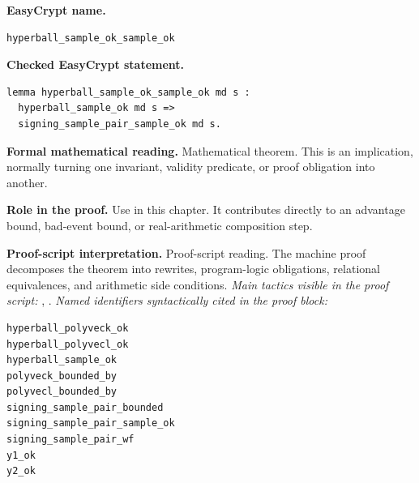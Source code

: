 \begin{formaltheorem}
\noindent\textbf{EasyCrypt name.}
\begin{lstlisting}[language=EasyCrypt,basicstyle=\ttfamily\scriptsize]
hyperball_sample_ok_sample_ok
\end{lstlisting}
\noindent\textbf{Checked EasyCrypt statement.}
\begin{lstlisting}[language=EasyCrypt,basicstyle=\ttfamily\scriptsize]
lemma hyperball_sample_ok_sample_ok md s :
  hyperball_sample_ok md s =>
  signing_sample_pair_sample_ok md s.
\end{lstlisting}
\noindent\textbf{Formal mathematical reading.}
Mathematical theorem. This is an implication, normally turning one invariant, validity predicate, or proof obligation into another.

\noindent\textbf{Role in the proof.}
Use in this chapter. It contributes directly to an advantage bound, bad-event bound, or real-arithmetic composition step.

\noindent\textbf{Proof-script interpretation.}
Proof-script reading. The machine proof decomposes the theorem into rewrites, program-logic obligations, relational equivalences, and arithmetic side conditions.
\emph{Main tactics visible in the proof script:} , .
\emph{Named identifiers syntactically cited in the proof block:}
\begin{lstlisting}[language=EasyCrypt,basicstyle=\ttfamily\scriptsize]
hyperball_polyveck_ok
hyperball_polyvecl_ok
hyperball_sample_ok
polyveck_bounded_by
polyvecl_bounded_by
signing_sample_pair_bounded
signing_sample_pair_sample_ok
signing_sample_pair_wf
y1_ok
y2_ok
\end{lstlisting}

\end{formaltheorem}

